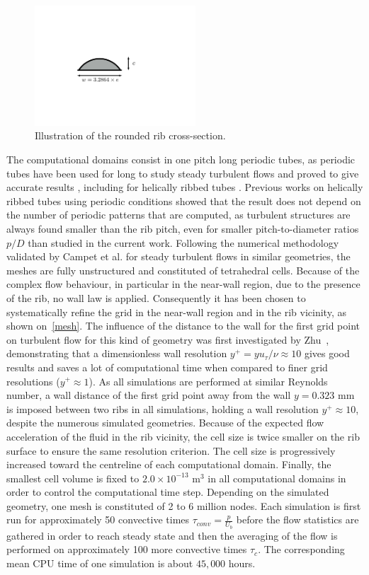 \begin{figure}[ht]
\centering
\includegraphics[width=6cm]{fig/applications/optim/rib_shape.pdf}
\caption{Illustration of the rounded rib cross-section.}
\label{rib}
\end{figure}

The computational domains consist in one pitch long periodic tubes, as periodic tubes have been used for long to study steady turbulent flows and proved to give accurate results \cite{rogallo1984,kim1987,JimenezMoin1991}, including for helically ribbed tubes \cite{campet2018}. Previous works on helically ribbed tubes using periodic conditions \cite{Zhu2015,campet2018} showed that the result does not depend on the number of periodic patterns that are computed, as turbulent structures are always found smaller than the rib pitch, even for smaller pitch-to-diameter ratios $p/D$ than studied in the current work. Following the numerical methodology validated by Campet et al. \cite{campet2018} for steady turbulent flows in similar geometries, the meshes are fully unstructured and constituted of tetrahedral cells. Because of the complex flow behaviour, in particular in the near-wall region, due to the presence of the rib, no wall law is applied. Consequently it has been chosen to systematically refine the grid in the near-wall region and in the rib vicinity, as shown on~\cref{mesh}. The influence of the distance to the wall for the first grid point on turbulent flow for this kind of geometry was first investigated by Zhu~\cite{Zhu2015}, demonstrating that a dimensionless wall resolution $y^+ = y u_{\tau} / \nu \approx 10$ gives good results and saves a lot of computational time when compared to finer grid resolutions ($y^+ \approx 1$). As all simulations are performed at similar Reynolds number, a wall distance of the first grid point away from the wall $y = 0.323$ mm is imposed between two ribs in all simulations, holding a wall resolution $y^+ \approx 10$, despite the numerous simulated geometries. Because of the expected flow acceleration of the fluid in the rib vicinity, the cell size is twice smaller on the rib surface to ensure the same resolution criterion. The cell size is progressively increased toward the centreline of each computational domain. Finally, the smallest cell volume is fixed to $2.0 \times 10^{-13}$ m$^3$ in all computational domains in order to control the computational time step. Depending on the simulated geometry, one mesh is constituted of 2 to 6 million nodes. Each simulation is first run for approximately 50 convective times $\tau_{conv} = \frac{p}{U_b}$ before the flow statistics are gathered in order to reach steady state and then the averaging of the flow is performed on approximately 100 more convective times $\tau_c$. The corresponding mean CPU time of one simulation is about $45,000$ hours. 

